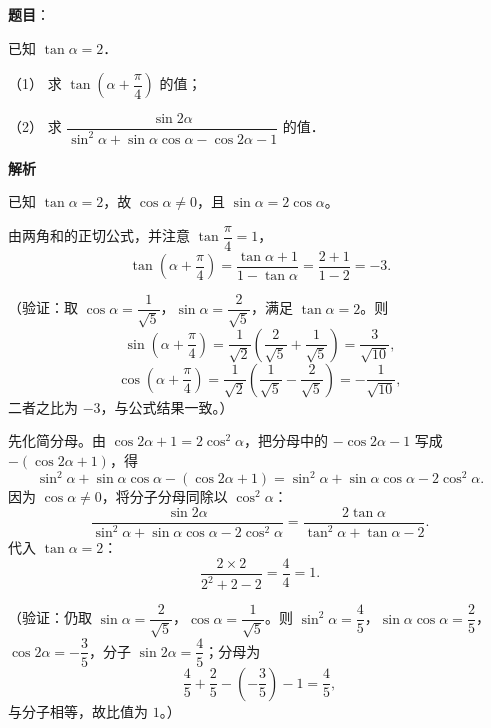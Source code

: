 \begin{answer}

\textbf{题目}：

已知 \(\tan\alpha=2\)．

（1） 求 \(\tan\left(\alpha+\dfrac{\pi}{4}\right)\) 的值；

（2） 求 \(\dfrac{\sin 2\alpha}{\sin^2\alpha+\sin\alpha\cos\alpha-\cos 2\alpha-1}\) 的值．

\textbf{解析}

已知 \(\tan\alpha=2\)，故 \(\cos\alpha\neq0\)，且 \(\sin\alpha=2\cos\alpha\)。


由两角和的正切公式，并注意 \(\tan\dfrac{\pi}{4}=1\)，
\nopagebreak[4]
\[
\tan\left(\alpha+\dfrac{\pi}{4}\right)
=\dfrac{\tan\alpha+1}{1-\tan\alpha}
=\dfrac{2+1}{1-2}
=-3.
\]

（验证：取 \(\cos\alpha=\dfrac{1}{\sqrt5}\)，\(\sin\alpha=\dfrac{2}{\sqrt5}\)，满足 \(\tan\alpha=2\)。则
\nopagebreak[4]
\[
\sin\left(\alpha+\dfrac{\pi}{4}\right)=\dfrac{1}{\sqrt2}\left(\dfrac{2}{\sqrt5}+\dfrac{1}{\sqrt5}\right)=\dfrac{3}{\sqrt{10}},
\]
\nopagebreak[4]
\[
\cos\left(\alpha+\dfrac{\pi}{4}\right)=\dfrac{1}{\sqrt2}\left(\dfrac{1}{\sqrt5}-\dfrac{2}{\sqrt5}\right)=-\dfrac{1}{\sqrt{10}},
\]
二者之比为 \(-3\)，与公式结果一致。）


先化简分母。由 \(\cos2\alpha+1=2\cos^2\alpha\)，把分母中的 \(-\cos2\alpha-1\) 写成 \(-(\cos2\alpha+1)\)，得
\nopagebreak[4]
\[
\sin^2\alpha+\sin\alpha\cos\alpha-(\cos2\alpha+1)
=\sin^2\alpha+\sin\alpha\cos\alpha-2\cos^2\alpha.
\]
因为 \(\cos\alpha\neq0\)，将分子分母同除以 \(\cos^2\alpha\)：
\nopagebreak[4]
\[
\dfrac{\sin2\alpha}{\sin^2\alpha+\sin\alpha\cos\alpha-2\cos^2\alpha}
=\dfrac{2\tan\alpha}{\tan^2\alpha+\tan\alpha-2}.
\]
代入 \(\tan\alpha=2\)：
\nopagebreak[4]
\[
\dfrac{2\times2}{2^2+2-2}=\dfrac{4}{4}=1.
\]

（验证：仍取 \(\sin\alpha=\dfrac{2}{\sqrt5}\)，\(\cos\alpha=\dfrac{1}{\sqrt5}\)。则 \(\sin^2\alpha=\dfrac45\)，\(\sin\alpha\cos\alpha=\dfrac25\)，\(\cos2\alpha=-\dfrac35\)，分子 \(\sin2\alpha=\dfrac45\)；分母为
\nopagebreak[4]
\[
\dfrac45+\dfrac25-\left(-\dfrac35\right)-1=\dfrac45,
\]
与分子相等，故比值为 \(1\)。）



\end{answer}
